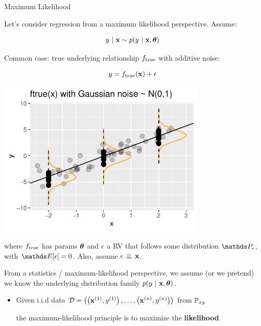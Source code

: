 \documentclass[11pt,compress,t,notes=noshow, xcolor=table]{beamer}
\begin{document}
\begin{vbframe}{Maximum Likelihood}

Let's consider regression from a maximum likelihood perspective. Assume: 

$$
	y~|~ \mathbf{x} \sim p(y~|~\mathbf{x}, \bm{\theta})
$$

\vspace{0.5cm}

Common case: 
true underlying relationship $f_{\text{true}}$ with additive noise: 

\vspace{0.5cm}

\begin{minipage}{0.5\textwidth}
$$
y = f_{\text{true}}(\mathbf{x}) + \epsilon
$$
\end{minipage}%
\begin{minipage}{0.5\textwidth}
\includegraphics[width = 0.75\textwidth]{figure/ftrue.pdf}
\end{minipage}

where $f_{\text{true}}$ has params $\bm{\theta}$ and $\epsilon$ a RV that follows some distribution $\P_\eps$, with $\E[\eps] = 0$. Also, assume $\epsilon \perp \!\!\! \perp \mathbf{x}$.


\framebreak 

From a statistics / maximum-likelihood perspective, we assume (or we pretend) we know the underlying distribution family $p(y~|~\mathbf{x}, \bm{\theta})$.

\begin{itemize}
\item Given i.i.d data $
\mathcal{D} = \left( \left(\mathbf{x}^{(1)}, y^{(1)}\right), \ldots, \left(\mathbf{x}^{(n)}, y^{(n)}\right)\right)
$
 from $\mathbb{P}_{xy}$ 

the maximum-likelihood principle is to maximize the \textbf{likelihood}


\end{itemize}
\end{vbframe}
\end{document}
